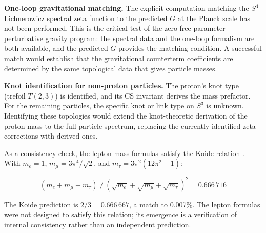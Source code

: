 
\item \textbf{One-loop gravitational matching.} The explicit computation matching the $S^4$ Lichnerowicz spectral zeta function to the predicted $G$ at the Planck scale has not been performed. This is the critical test of the zero-free-parameter perturbative gravity program: the spectral data \cite{camporesi1994} and the one-loop formalism \cite{christensenduff1979} are both available, and the predicted $G$ provides the matching condition. A successful match would establish that the gravitational counterterm coefficients are determined by the same topological data that gives particle masses.


\item \textbf{Knot identification for non-proton particles.} The proton's knot type (trefoil $T(2,3)$) is identified, and its CS invariant derives the mass prefactor. For the remaining particles, the specific knot or link type on $S^3$ is unknown. Identifying these topologies would extend the knot-theoretic derivation of the proton mass to the full particle spectrum, replacing the currently identified zeta corrections with derived ones.




As a consistency check, the lepton mass formulas satisfy the Koide relation \cite{koide1983}. With $m_e = 1$, $m_\mu = 3\pi^4/\sqrt{2}$, and $m_\tau = 3\pi^2(12\pi^2 - 1)$:

$$(m_e + m_\mu + m_\tau) \;/\; (\sqrt{m_e} + \sqrt{m_\mu} + \sqrt{m_\tau})^2 = 0.666\,716$$

The Koide prediction is $2/3 = 0.666\,667$, a match to 0.007\%. The lepton formulas were not designed to satisfy this relation; its emergence is a verification of internal consistency rather than an independent prediction.




